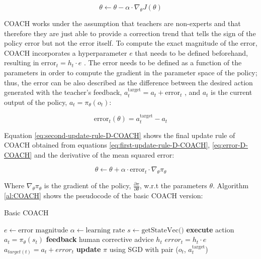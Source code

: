 \begin{equation}
\theta \leftarrow \theta - \alpha \cdot \nabla_\theta J(\theta)
\label{eq:first-update-rule-D-COACH}
\end{equation}

COACH works under the assumption that teachers are non-experts and that therefore they are just able to provide a correction trend that tells the sign of the policy error but not the error itself. To compute the exact magnitude of the error, COACH incorporates a hyperparameter $e$ that needs to be defined beforehand, resulting in $\text{error}_t = h_t \cdot e$  \cite{COACH-Celemin-Ruiz-del-Solar:2015}. The error needs to be defined as a function of the parameters in order to compute the gradient in the parameter space of the policy; thus, the error can be also described as the difference between the desired action generated with the teacher's feedback, $a^\text{target}_t = a_t + \text{error}_t$ , and $a_t$ is the current output of the policy, $a_t = \pi_\theta(o_t)$:


\begin{equation}
\text{error}_t(\theta) = a_t^\text{target} - a_t
\label{eq:error-D-COACH}
\end{equation}


Equation \ref{eq:second-update-rule-D-COACH} shows the final update rule of COACH obtained from equations \ref{eq:first-update-rule-D-COACH}, \ref{eq:error-D-COACH} and the derivative of the mean squared error:


\begin{equation}
\theta \leftarrow \theta + \alpha \cdot \text{error}_t \cdot \nabla_\theta \pi_\theta
\label{eq:second-update-rule-D-COACH}
\end{equation}



Where $\nabla_\theta \pi_\theta$ is the gradient of the policy, $\frac{\partial \pi}{\partial \theta}$, w.r.t the parameters $\theta$. Algorithm \ref{al:COACH} shows the pseudocode of the basic COACH version:


\begin{algorithm}[H]
\caption{Basic COACH}\label{algorithm:DeepCOACH}
\begin{algorithmic}[1]
\State $e \leftarrow \text{error magnitude}$ 
\State $\alpha \leftarrow \text{learning rate}$ 
 {}
\State $s \leftarrow \text{getStateVec()}$
\State \textbf{execute} action $a_{t}=\pi_{\theta}(s_{t})$
\State \textbf{feedback} human corrective advice $h_{t}$
\State $\mathit{error}_{t} = h_{t}\cdot e$
\State $a_{target(t)} = a_{t} + \mathit{error}_{t}$
\State \textbf{update} $\pi$ using SGD with pair ($o_{t}$, $a^{\text{target}}_{t}$)
\EndIf
\EndWhile
\end{algorithmic}
\label{al:COACH}
\end{algorithm}


